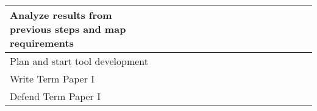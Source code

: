 \begin{table}
{\begin{tabular}{|l|l|l|l|l|l|l|l|l|l|l|l|l|l|l|l|l|}
      \hline
      Analyze results from previous steps and map requirements           &                                      &                                      &                                      &                                      &                                      & {\cellcolor[rgb]{0.753,0.753,0.753}} & {\cellcolor[rgb]{0.753,0.753,0.753}} &                                      &                                      &                                      &                                      &                                      &                                      &                                      &                                      &                                      \\
      \hline
      Plan and start tool development                                    &                                      &                                      &                                      &                                      &                                      &                                      & {\cellcolor[rgb]{0.753,0.753,0.753}} & {\cellcolor[rgb]{0.753,0.753,0.753}} &                                      &                                      &                                      &                                      &                                      &                                      &                                      &                                      \\
      \hline
      Write Term Paper I                                                 &                                      &                                      &                                      &                                      &                                      &                                      &                                      & {\cellcolor[rgb]{0.753,0.753,0.753}} & {\cellcolor[rgb]{0.753,0.753,0.753}} & {\cellcolor[rgb]{0.753,0.753,0.753}} &                                      &                                      &                                      &                                      &                                      &                                      \\
      \hline
      Defend Term Paper I                                                &                                      &                                      &                                      &                                      &                                      &                                      &                                      &                                      &                                      & {\cellcolor[rgb]{0.753,0.753,0.753}} &                                      &                                      &                                      &                                      &                                      &                                      \\

\end{tabular}}
\end{table}

